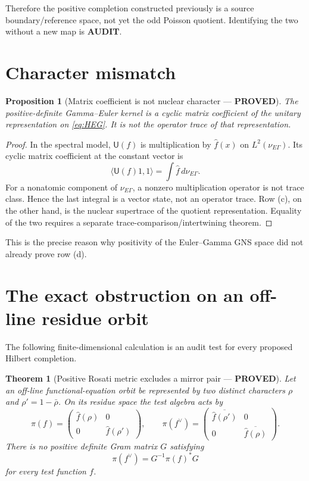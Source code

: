 \documentclass[11pt]{article}
\newcommand{\PROVED}{\textcolor{green!40!black}{\textbf{PROVED}}}
\newcommand{\AUDIT}{\textcolor{orange!70!black}{\textbf{AUDIT}}}
\newtheorem{theorem}{Theorem}
\newtheorem{proposition}{Proposition}
\begin{document}
Therefore the positive completion constructed previously is a source
boundary/reference space, not yet the odd Poisson quotient.  Identifying the
two without a new map is \AUDIT.

\section{Character mismatch}

\begin{proposition}[Matrix coefficient is not nuclear character --- \PROVED]
The positive-definite Gamma--Euler kernel is a cyclic matrix coefficient of
the unitary representation on \eqref{eq:HEG}.  It is not the operator trace
of that representation.
\end{proposition}

\begin{proof}
In the spectral model, $\mathsf U(f)$ is multiplication by $\widehat f(x)$
on $L^2(\nu_{E\Gamma})$.  Its cyclic matrix coefficient at the constant
vector is
\[
 \langle\mathsf U(f)1,1\rangle=\int\widehat f\,d\nu_{E\Gamma}.
\]
For a nonatomic component of $\nu_{E\Gamma}$, a nonzero multiplication
operator is not trace class.  Hence the last integral is a vector state, not
an operator trace.  Row (c), on the other hand, is the nuclear supertrace of
the quotient representation.  Equality of the two requires a separate
trace-comparison/intertwining theorem.
\end{proof}

This is the precise reason why positivity of the Euler--Gamma GNS space did
not already prove row (d).

\section{The exact obstruction on an off-line residue orbit}

The following finite-dimensional calculation is an audit test for every
proposed Hilbert completion.

\begin{theorem}[Positive Rosati metric excludes a mirror pair --- \PROVED]
Let an off-line functional-equation orbit be represented by two distinct
characters $\rho$ and $\rho'=1-\bar\rho$.  On its residue space the test
algebra acts by
\[
 \pi(f)=\begin{pmatrix}\widehat f(\rho)&0\\0&\widehat f(\rho')\end{pmatrix},
 \qquad
 \pi(f^\vee)=
 \begin{pmatrix}\overline{\widehat f(\rho')}&0\\
                 0&\overline{\widehat f(\rho)}\end{pmatrix}.
\]
There is no positive definite Gram matrix $G$ satisfying
\[
 \pi(f^\vee)=G^{-1}\pi(f)^*G
\]
for every test function $f$.
\end{theorem}
\end{document}
